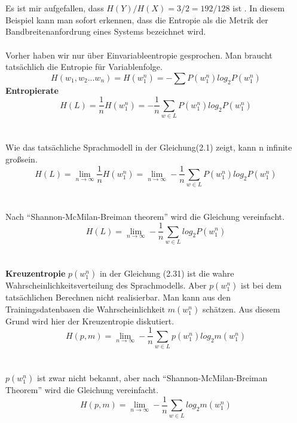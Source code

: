 \\
\\
Es ist mir aufgefallen, dass $H(Y)/H(X)=3/2=192/128$ ist . In diesem Beispiel kann man sofort erkennen, dass die Entropie als die Metrik der Bandbreitenanfordrung eines Systems bezeichnet wird.
\\
\\   
Vorher haben wir nur \"uber Einvariableentropie gesprochen. Man braucht tats\"achlich die Entropie f\"ur Variablenfolge.
\begin{equation}
H(w_{1},w_{2}...w_{n})=H(w_{1}^{n})=-\sum{P(w_{1}^{n})log_{2}P(w_{1}^{n})}
\end{equation}
\textbf{Entropierate}
\begin{equation}
H(L)=\frac{1}{n}H(w_{1}^{n})=-\frac{1}{n}\sum_{w\in L}P(w_{1}^{n})log_{2}P(w_{1}^{n})
\end{equation}
\\
\\
Wie das tats\"achliche Sprachmodell in der Gleichung(2.1) zeigt, kann n infinite gro\ss sein.
\begin{equation}
H(L)=\lim_{n\to\infty}\frac{1}{n}H(w_{1}^{n})=\lim_{n\to\infty}-\frac{1}{n}\sum_{w\in L}P(w_{1}^{n})log_{2}P(w_{1}^{n})
\end{equation}
\\
\\
Nach "`Shannon-McMilan-Breiman theorem"' wird die Gleichung vereinfacht.
\begin{equation}
H(L)=\lim_{n\to\infty}-\frac{1}{n}\sum_{w\in L}log_{2}P(w_{1}^{n})
\end{equation}
\\
\\
\textbf{Kreuzentropie}
$p(w_{1}^{n})$ in der Gleichung (2.31) ist die wahre Wahrscheinlichkeitsverteilung des Sprachmodells. Aber $p(w_{1}^{n})$ ist bei dem tats\"achlichen Berechnen nicht realisierbar. Man kann aus den Trainingsdatenbasen die Wahrscheinlichkeit $m(w_{1}^{n})$ sch\"atzen. Aus diesem Grund  wird hier der Kreuzentropie diskutiert.
\begin{equation}
H(p,m)=\lim_{n\to\infty}-\frac{1}{n}\sum_{w\in L}p(w_{1}^{n})log_{2}m(w_{1}^{n})
\end{equation}
\\
\\
$p(w_{1}^{n})$ ist zwar nicht bekannt, aber nach "`Shannon-McMilan-Breiman Theorem"' wird die Gleichung vereinfacht. 
\begin{equation}
H(p,m)=\lim_{n\to\infty}-\frac{1}{n}\sum_{w\in L}log_{2}m(w_{1}^{n})
\end{equation}
